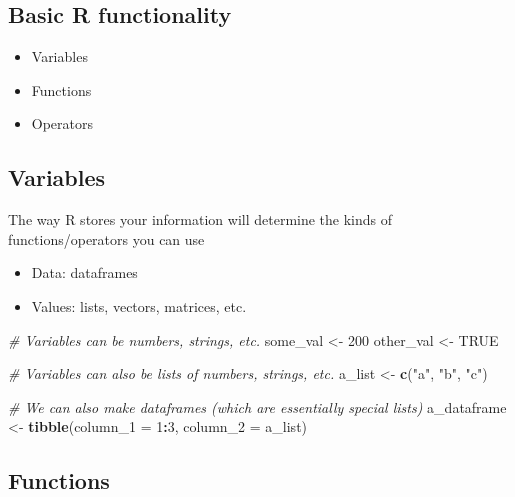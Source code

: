 \documentclass[
  openany]{book}
\newenvironment{Shaded}{\begin{snugshade}}{\end{snugshade}}
\newcommand{\CommentTok}[1]{\textcolor[rgb]{0.56,0.35,0.01}{\textit{#1}}}
\newcommand{\DataTypeTok}[1]{\textcolor[rgb]{0.13,0.29,0.53}{#1}}
\newcommand{\DecValTok}[1]{\textcolor[rgb]{0.00,0.00,0.81}{#1}}
\newcommand{\KeywordTok}[1]{\textcolor[rgb]{0.13,0.29,0.53}{\textbf{#1}}}
\newcommand{\NormalTok}[1]{#1}
\newcommand{\OperatorTok}[1]{\textcolor[rgb]{0.81,0.36,0.00}{\textbf{#1}}}
\newcommand{\OtherTok}[1]{\textcolor[rgb]{0.56,0.35,0.01}{#1}}
\newcommand{\StringTok}[1]{\textcolor[rgb]{0.31,0.60,0.02}{#1}}
\providecommand{\tightlist}{%
  \setlength{\itemsep}{0pt}\setlength{\parskip}{0pt}}
\begin{document}
\hypertarget{basic-r-functionality}{%
\subsection{Basic R functionality}\label{basic-r-functionality}}

\begin{itemize}
\tightlist
\item
  Variables
\item
  Functions
\item
  Operators
\end{itemize}

\hypertarget{variables}{%
\subsection{Variables}\label{variables}}

The way R stores your information will determine the kinds of functions/operators you can use

\begin{itemize}
\tightlist
\item
  Data: dataframes
\item
  Values: lists, vectors, matrices, etc.
\end{itemize}

\begin{Shaded}
\begin{Highlighting}[]
\CommentTok{# Variables can be numbers, strings, etc.}
\NormalTok{some_val <-}\StringTok{ }\DecValTok{200}
\NormalTok{other_val <-}\StringTok{ }\OtherTok{TRUE}

\CommentTok{# Variables can also be lists of numbers, strings, etc.}
\NormalTok{a_list <-}\StringTok{ }\KeywordTok{c}\NormalTok{(}\StringTok{"a"}\NormalTok{, }\StringTok{"b"}\NormalTok{, }\StringTok{"c"}\NormalTok{)}

\CommentTok{# We can also make dataframes (which are essentially special lists)}
\NormalTok{a_dataframe <-}\StringTok{ }\KeywordTok{tibble}\NormalTok{(}\DataTypeTok{column_1 =} \DecValTok{1}\OperatorTok{:}\DecValTok{3}\NormalTok{,}
                      \DataTypeTok{column_2 =}\NormalTok{ a_list)}
\end{Highlighting}
\end{Shaded}

\hypertarget{functions}{%
\subsection{Functions}\label{functions}}
\end{document}
